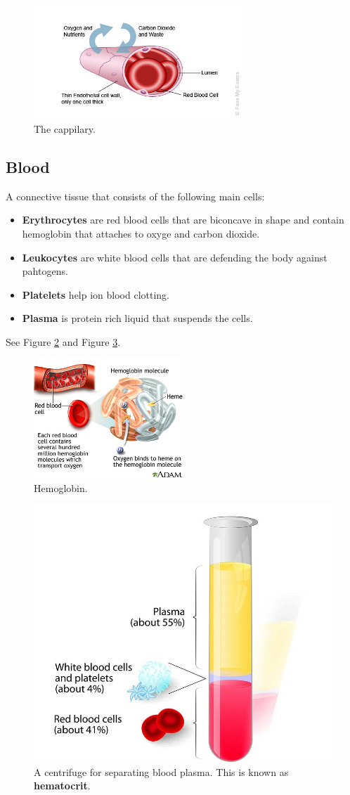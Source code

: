 \documentclass[12pt]{report}
\begin{document}
\begin{figure}[H]
\centering
    \includegraphics[width=0.7\textwidth]{../figures/capillary.jpg}
    \caption{The cappilary.}
    \label{fig:capillary}
\end{figure}

\subsection{Blood}
\begin{definition}[Blood]
    A connective tissue that consists of the following main cells: 
    \begin{itemize}
        \item{ \textbf{Erythrocytes} are red blood cells that are biconcave in shape and contain hemoglobin that attaches to oxyge and carbon dioxide.}
        \item{ \textbf{Leukocytes} are white blood cells that are defending the body against pahtogens.}
        \item{ \textbf{Platelets } help ion blood clotting.}
        \item{ \textbf{Plasma} is protein rich liquid that suspends the cells.}
    \end{itemize}
    See Figure \ref{fig:hemoglobin} and Figure \ref{fig:hematocrit}.
\end{definition}

\begin{figure}[H]
\centering
    \includegraphics[width=0.5\textwidth]{../figures/hemloblogin.jpg}
    \caption{Hemoglobin.}
    \label{fig:hemoglobin}
\end{figure}

\begin{figure}[H]
\centering
    \includegraphics[width=0.5 \textwidth ]{../figures/hematocrit.png}
    \caption{A centrifuge for separating blood plasma. This is known as \textbf{hematocrit}.}
    \label{fig:hematocrit}
\end{figure}
\end{document}
